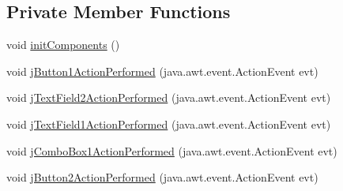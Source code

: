 \subsection*{Private Member Functions}
\begin{DoxyCompactItemize}
\item 
void \mbox{\hyperlink{classejercicio2_1_1_camion_interfaz_aa48968cf36e25fbb1780655fae1e772c}{init\+Components}} ()
\item 
void \mbox{\hyperlink{classejercicio2_1_1_camion_interfaz_a46d5fa816420dfcdd1f92e946a42bf24}{j\+Button1\+Action\+Performed}} (java.\+awt.\+event.\+Action\+Event evt)
\item 
void \mbox{\hyperlink{classejercicio2_1_1_camion_interfaz_afc95c6247a265c4899531f4883bc5e75}{j\+Text\+Field2\+Action\+Performed}} (java.\+awt.\+event.\+Action\+Event evt)
\item 
void \mbox{\hyperlink{classejercicio2_1_1_camion_interfaz_ac8b7b51b871c783eda39bb194ae0b72a}{j\+Text\+Field1\+Action\+Performed}} (java.\+awt.\+event.\+Action\+Event evt)
\item 
void \mbox{\hyperlink{classejercicio2_1_1_camion_interfaz_a636cf97354884d87701e174ee0d7f483}{j\+Combo\+Box1\+Action\+Performed}} (java.\+awt.\+event.\+Action\+Event evt)
\item 
void \mbox{\hyperlink{classejercicio2_1_1_camion_interfaz_ac15dc3135ad2cdd45b4760373de80418}{j\+Button2\+Action\+Performed}} (java.\+awt.\+event.\+Action\+Event evt)
\end{DoxyCompactItemize}
